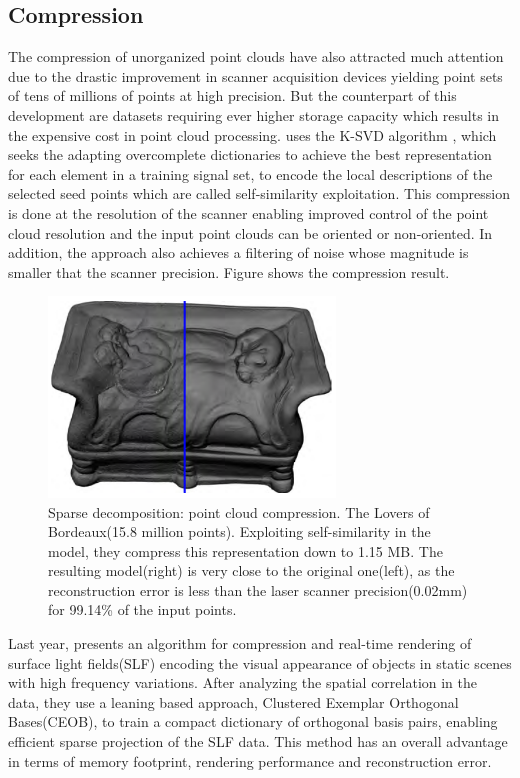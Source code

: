 \subsection{Compression}

The compression of unorganized point clouds have also attracted much attention due to the drastic improvement in scanner acquisition devices yielding point sets of tens of millions of points at high precision. But the counterpart of this development are datasets requiring ever higher storage capacity which results in the expensive cost in point cloud processing. \cite{digne2014self} uses the K-SVD algorithm \cite{aharon2006svd}, which seeks the adapting overcomplete dictionaries to achieve the best representation for each element in a training signal set, to encode the local descriptions of the selected seed points which are called self-similarity exploitation. This compression is done at the resolution of the scanner enabling improved control of the point cloud resolution and the input point clouds can be oriented or non-oriented. In addition, the approach also achieves a filtering of noise whose magnitude is smaller that the scanner precision. Figure shows the compression result.

\begin{figure}[ht]
  \centering
  \includegraphics[width=3in]{images/compression_learning}
  \caption{Sparse decomposition: point cloud compression\cite{digne2014self}. The Lovers of Bordeaux(15.8 million points). Exploiting self-similarity in the model, they compress this representation down to 1.15 MB. The resulting model(right) is very close to the original one(left), as the reconstruction error is less than the laser scanner precision(0.02mm) for 99.14\% of the input points.}
\end{figure}

Last year, \cite{miandji2013learning} presents an algorithm for compression and real-time rendering of surface light fields(SLF) encoding the visual appearance of objects in static scenes with high frequency variations. After analyzing the spatial correlation in the data, they use a leaning based approach, Clustered Exemplar Orthogonal Bases(CEOB), to train a compact dictionary of orthogonal basis pairs, enabling efficient sparse projection of the SLF data. This method has an overall advantage in terms of memory footprint, rendering performance and reconstruction error.

